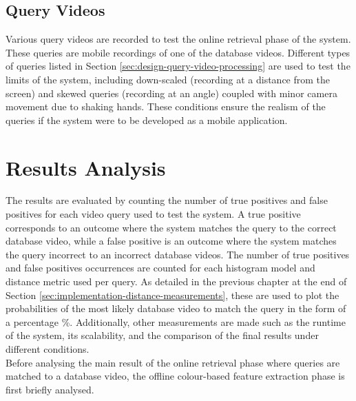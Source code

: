 
\subsection{Query Videos}

Various query videos are recorded to test the online retrieval phase of the system. These queries are mobile recordings of one of the database videos. Different types of queries listed in Section \ref{sec:design-query-video-processing} are used to test the limits of the system, including down-scaled (recording at a distance from the screen) and skewed queries (recording at an angle) coupled with minor camera movement due to shaking hands. These conditions ensure the realism of the queries if the system were to be developed as a mobile application.


\section{Results Analysis}

The results are evaluated by counting the number of true positives and false positives for each video query used to test the system. A true positive corresponds to an outcome where the system matches the query to the correct database video, while a false positive is an outcome where the system matches the query incorrect to an incorrect database videos. The number of true positives and false positives occurrences are counted for each histogram model and distance metric used per query. As detailed in the previous chapter at the end of Section \ref{sec:implementation-distance-measurements}, these are used to plot the probabilities of the most likely database video to match the query in the form of a percentage \%. Additionally, other measurements are made such as the runtime of the system, its scalability, and the comparison of the final results under different conditions.\\

Before analysing the main result of the online retrieval phase where queries are matched to a database video, the offline colour-based feature extraction phase is first briefly analysed.

